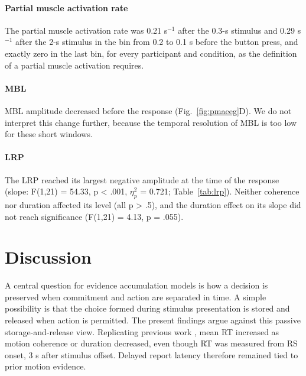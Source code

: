\documentclass[a4paper,11pt]{article}
\theoremstyle{definition}
\newcommand{\1}{\mathbbm{1}}
\begin{document}
\paragraph{Partial muscle activation rate}

The partial muscle activation rate was 0.21 s$^{-1}$ after the 0.3-s stimulus and 0.29 s$^{-1}$ after the 2-s stimulus in the bin from 0.2 to 0.1 s before the button press, and exactly zero in the last bin, for every participant and condition, as the definition of a partial muscle activation requires.

\paragraph{MBL}

MBL amplitude decreased before the response (Fig.~\ref{fig:pmaeeg}D). We do not interpret this change further, because the temporal resolution of MBL is too low for these short windows.

\paragraph{LRP}

The LRP reached its largest negative amplitude at the time of the response (slope: F(1,21) = 54.33, p < .001, $\eta_{p}^{2}$ = 0.721; Table~\ref{tab:lrp}). Neither coherence nor duration affected its level (all p > .5), and the duration effect on its slope did not reach significance (F(1,21) = 4.13, p = .055).


\section{Discussion}

A central question for evidence accumulation models is how a decision is preserved when commitment and action are separated in time. A simple possibility is that the choice formed during stimulus presentation is stored and released when action is permitted. The present findings argue against this passive storage-and-release view. Replicating previous work \parencites{achardExtendingContinuousFlow2025}{roggeMotorCorticalSignals2022}, mean RT increased as motion coherence or duration decreased, even though RT was measured from RS onset, 3 s after stimulus offset. Delayed report latency therefore remained tied to prior motion evidence.
\end{document}
